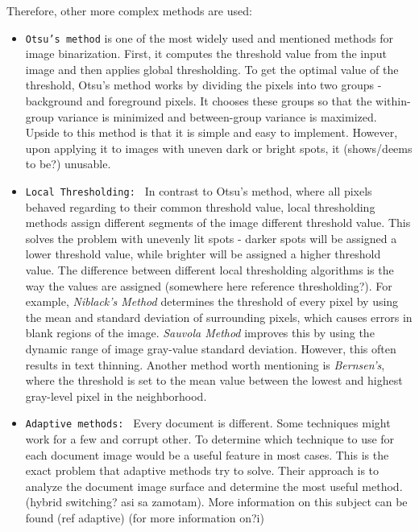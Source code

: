 Therefore, other more complex methods are used:

\begin{itemize}
\item\texttt{Otsu's method} is one of the most widely used and mentioned methods for image binarization. First, it computes the threshold value from the input image and then applies global thresholding. To get the optimal value of the threshold, Otsu's method works by dividing the pixels into two groups - background and foreground pixels. It chooses these groups so that the within-group variance is minimized and between-group variance is maximized. Upside to this method is that it is simple and easy to implement. However, upon applying it to images with uneven dark or bright spots, it (shows/deems to be?) unusable.

\item\texttt{Local Thresholding: } In contrast to Otsu's method, where all pixels behaved regarding to their common threshold value, local thresholding methods assign different segments of the image different threshold value. This solves the problem with unevenly lit spots - darker spots will be assigned a lower threshold value, while brighter will be assigned a higher threshold value. The difference between different local thresholding algorithms is the way the values are assigned (somewhere here reference thresholding?). For example, \emph{Niblack's Method} determines the threshold of every pixel by using the mean and standard deviation of surrounding pixels, which causes errors in blank regions of the image. \emph{Sauvola Method} improves this by using the dynamic range of image gray-value standard deviation. However, this often results in text thinning. Another method worth mentioning is \emph{Bernsen's}, where the threshold is set to the mean value between the lowest and highest gray-level pixel in the neighborhood.

\item\texttt{Adaptive methods: } Every document is different. Some techniques might work for a few and corrupt other. To determine which technique to use for each document image would be a useful feature in most cases. This is the exact problem that adaptive methods try to solve. Their approach is to analyze the document image surface and determine the most useful method. (hybrid switching? asi sa zamotam). More information on this subject can be found (ref adaptive) (for more information on?i)

\end{itemize}

